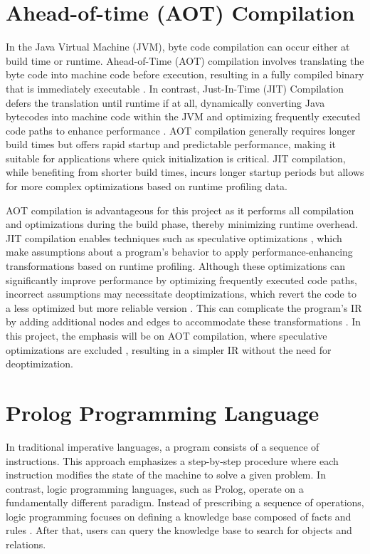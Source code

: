 \section{Ahead-of-time (AOT) Compilation}
In the Java Virtual Machine (JVM), byte code compilation can occur either at build time or runtime. Ahead-of-Time (AOT) compilation involves translating the byte code into machine code before execution, resulting in a fully compiled binary that is immediately executable \cite{Wade2017}. In contrast, Just-In-Time (JIT) Compilation defers the translation until runtime if at all, dynamically converting Java bytecodes into machine code within the JVM and optimizing frequently executed code paths to enhance performance \cite{Wade2017}. AOT compilation generally requires longer build times but offers rapid startup and predictable performance, making it suitable for applications where quick initialization is critical. JIT compilation, while benefiting from shorter build times, incurs longer startup periods but allows for more complex optimizations based on runtime profiling data.

AOT compilation is advantageous for this project as it performs all compilation and optimizations during the build phase, thereby minimizing runtime overhead. JIT compilation enables techniques such as speculative optimizations \cite{Duboscq2013Inproceedings}, which make assumptions about a program’s behavior to apply performance-enhancing transformations based on runtime profiling. Although these optimizations can significantly improve performance by optimizing frequently executed code paths, incorrect assumptions may necessitate deoptimizations, which revert the code to a less optimized but more reliable version \cite{Duboscq2013Inproceedings}. This can complicate the program's IR by adding additional nodes and edges to accommodate these transformations \cite{Duboscq2013Inproceedings}. In this project, the emphasis will be on AOT compilation, where speculative optimizations are excluded \cite{Wimmer2019}, resulting in a simpler IR without the need for deoptimization. 

\section{Prolog Programming Language}

In traditional imperative languages, a program consists of a sequence of instructions. This approach emphasizes a step-by-step procedure where each instruction modifies the state of the machine to solve a given problem. In contrast, logic programming languages, such as Prolog, operate on a fundamentally different paradigm. Instead of prescribing a sequence of operations, logic programming focuses on defining a knowledge base composed of facts and rules \cite{Bramer2013}. After that, users can query the knowledge base to search for objects and relations. 

